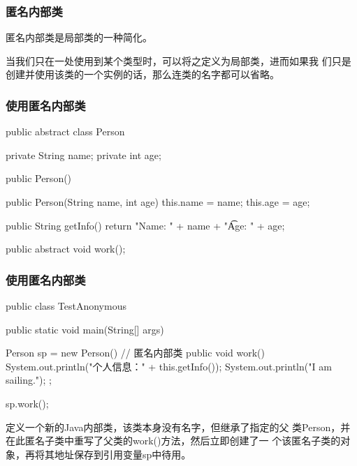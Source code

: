 \begin{frame}[fragile] %
\frametitle{匿名内部类}

匿名内部类是局部类的一种简化。

{\kai 当我们只在一处使用到某个类型时，可以将之定义为局部类，进而如果我
  们只是创建并使用该类的一个实例的话，那么连类的名字都可以省略。}
\end{frame}

\begin{frame}[fragile] %
  \frametitle{使用匿名内部类}


  \begin{javaCode}
    public abstract class Person {
      private String name;
      private int age;
      
      public Person() {}
      
      public Person(String name, int age) {
        this.name = name;
        this.age = age;
      }
      
      public String getInfo() {
        return "Name: " + name + "\t Age: " + age;
      }
      
      public abstract void work();
    }  
  \end{javaCode}
\end{frame}

\begin{frame}[fragile] %
  \frametitle{使用匿名内部类}


  \begin{javaCode}
    public class TestAnonymous {
      public static void main(String[] args) {
        Person sp = new Person() { // 匿名内部类
          public void work() {
            System.out.println("个人信息：" + this.getInfo());
            System.out.println("I am sailing.");
          }
        };
        
        sp.work();
      }
    }
  \end{javaCode}

  \pause
  

  {\small\Red 定义一个新的Java内部类，该类本身没有名字，但继承了指定的父
    类Person，并在此匿名子类中重写了父类的work()方法，然后立即创建了一
    个该匿名子类的对象，再将其地址保存到引用变量sp中待用。}
\end{frame}

